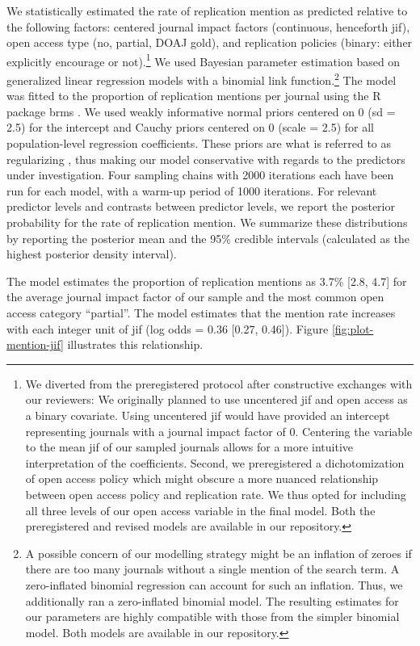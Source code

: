 \documentclass[cm,linguex]{glossa}
\begin{document}
We statistically estimated the rate of replication mention as predicted relative to the following factors:
centered journal impact factors (continuous, henceforth jif), open access type (no, partial, DOAJ gold), and replication policies (binary: either explicitly encourage or not).\footnote{We diverted from the preregistered protocol after constructive exchanges with our reviewers: We originally planned to use uncentered jif and open access as a binary covariate. Using uncentered jif would have provided an intercept representing journals with a journal impact factor of 0. Centering the variable to the mean jif of our sampled journals allows for a more intuitive interpretation of the coefficients. Second, we preregistered a dichotomization of open access policy which might obscure a more nuanced relationship between open access policy and replication rate. We thus opted for including all three levels of our open access variable in the final model. Both the preregistered and revised models are available in our repository.}
We used Bayesian parameter estimation based on generalized linear regression models with a binomial link function.\footnote{A possible concern of our modelling strategy might be an inflation of zeroes if there are too many journals without a single mention of the search term. A zero-inflated binomial regression can account for such an inflation. Thus, we additionally ran a zero-inflated binomial model. The resulting estimates for our parameters are highly compatible with those from the simpler binomial model. Both models are available in our repository.}
The model was fitted to the proportion of replication mentions per journal using the R package brms \citep{burkner_brms_2016}.
We used weakly informative normal priors centered on 0 (sd = 2.5) for the intercept and Cauchy priors centered on 0 (scale = 2.5) for all population-level regression coefficients.
These priors are what is referred to as regularizing \citep{gelman_weakly_2008}, thus making our model conservative with regards to the predictors under investigation.
Four sampling chains with 2000 iterations each have been run for each model, with a warm-up period of 1000 iterations.
For relevant predictor levels and contrasts between predictor levels, we report the posterior probability for the rate of replication mention.
We summarize these distributions by reporting the posterior mean and the 95\% credible intervals (calculated as the highest posterior density interval).

The model estimates the proportion of replication mentions as 3.7\% {[}2.8, 4.7{]} for the average journal impact factor of our sample and the most common open access category ``partial''. The model estimates that the mention rate increases with each integer unit of jif (log odds = 0.36 {[}0.27, 0.46{]}).
Figure \ref{fig:plot-mention-jif} illustrates this relationship.
\end{document}
